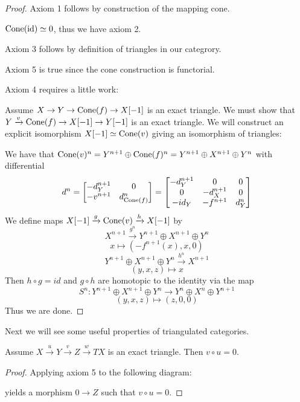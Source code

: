 \documentclass[a4paper, UKenglish]{report}
\begin{document}
\begin{proof}
Axiom 1 follows by construction of the mapping cone.

$\operatorname{Cone}(\operatorname{id}) \simeq 0$, thus we have axiom 2.

Axiom 3 follows by definition of triangles in our categrory.

Axiom 5 is true since the cone construction is functorial.

Axiom 4 requires a little work:

Assume  $X \to Y \to \operatorname{Cone}(f) \to X[-1]$ is an exact triangle. We must show that  $Y \xrightarrow{v} \operatorname{Cone}(f) \to X[-1] \to Y[-1]$ is an exact triangle. We will construct an explicit isomorphism $X[-1] \simeq \operatorname{Cone}(v)$ giving an isomorphism of triangles:

We have that $\operatorname{Cone}(v)^n = Y^{n+1} \oplus \operatorname{Cone}(f)^n = Y^{n+1} \oplus X^{n+1} \oplus Y^n$ with differential 
\[ d^n = \begin{bmatrix} -d_Y^{n+1} & 0 \\ -v^{n+1} & d_{\operatorname{Cone}(f)}^n \end{bmatrix}=\begin{bmatrix} -d_Y^{n+1} & 0 &  0 \\ 0 & -d_X^{n+1} & 0 \\ -id_Y & -f^{n+1} & d_Y^n \end{bmatrix} \]
We define maps $ X[-1] \xrightarrow{g} \operatorname{Cone}(v) \xrightarrow{h} X[-1]$ by
\[ X^{n+1} \xrightarrow{g^n}   Y^{n+1} \oplus X^{n+1} \oplus Y^n \]
\[ x \mapsto (-f^{n+1}(x),x,0) \]
\[ Y^{n+1} \oplus X^{n+1} \oplus Y^n \xrightarrow{h^n}   X^{n+1}  \]
\[ (y,x,z) \mapsto x \]
Then $h \circ g = id$ and $g \circ h$ are homotopic to the identity via the map
\[ S^n: Y^{n+1} \oplus X^{n+1} \oplus Y^n \to Y^n \oplus X^n \oplus Y^{n+1} \]
\[ (y,x,z) \mapsto (z,0,0) \]
Thus we are done.
\end{proof}

Next we will see some useful properties of triangulated categories.

\begin{proposition} \label{compzero}
Assume $X \xrightarrow{u}  Y \xrightarrow{v} Z \xrightarrow{w} TX$ is an exact triangle. Then $v \circ u = 0$.
\end{proposition}
\begin{proof}
Applying axiom 5 to the following diagram:


yields a morphism $0 \to Z$ such that $v \circ u = 0$.
\end{proof}
\end{document}
